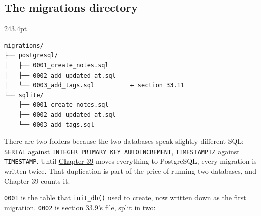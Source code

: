 \subsection*{The migrations directory}\label{33-logic-execution:the-migrations-directory}

\begin{diagrambox}[short]{243.4pt}
\begin{Verbatim}[fontsize=\fontsize{9.0}{8.55}\selectfont]
migrations/
├── postgresql/
│   ├── 0001_create_notes.sql
│   ├── 0002_add_updated_at.sql
│   └── 0003_add_tags.sql          ← section 33.11
└── sqlite/
    ├── 0001_create_notes.sql
    ├── 0002_add_updated_at.sql
    └── 0003_add_tags.sql
\end{Verbatim}
\end{diagrambox}

\noindent{}There are two folders because the two databases speak slightly different SQL: \texttt{SERIAL} against \texttt{INTEGER\ PRIMARY\ KEY\ AUTOINCREMENT}, \texttt{TIMESTAMPTZ} against \texttt{TIMESTAMP}. Until \hyperref[ch:39-local-vs-production]{Chapter 39} moves everything to PostgreSQL, every migration is written twice. That duplication is part of the price of running two databases, and Chapter 39 counts it.

\texttt{0001} is the table that \texttt{init\_db()} used to create, now written down as the first migration. \texttt{0002} is section 33.9's file, split in two:

\begin{codebox}[short]

\begin{Shaded}
\begin{Highlighting}[]
 
     \NormalTok{,}
 \NormalTok{,}
   
\NormalTok{);}
\end{Highlighting}
\end{Shaded}

\end{codebox}

\begin{codebox}[short]

\begin{Shaded}
\begin{Highlighting}[]
  
\end{Highlighting}
\end{Shaded}

\end{codebox}

